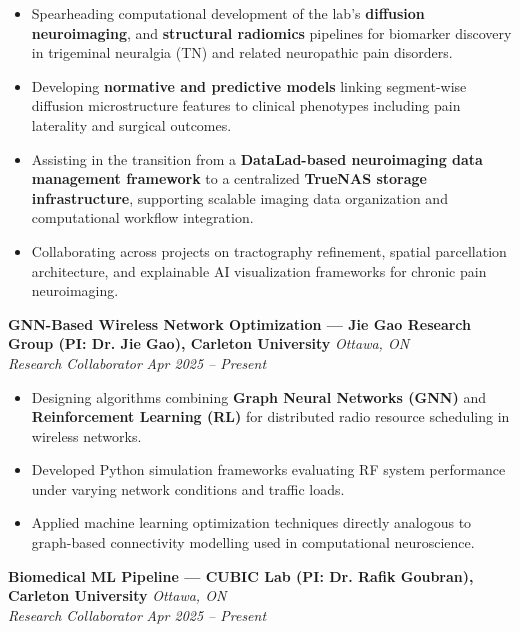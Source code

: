 \documentclass[11pt, letterpaper]{article}
\newcommand{\cventry}[4]{
    \noindent\textbf{#1} \hfill \textit{#2} \\
    \textit{#3} \hfill \textit{\small #4} \\
    \vspace{-4pt}
}
\begin{document}
\begin{itemize}[leftmargin=1.5em, topsep=2pt, itemsep=2pt]
    \item Spearheading computational development of the lab's \textbf{diffusion neuroimaging}, and \textbf{structural radiomics} pipelines for biomarker discovery in trigeminal neuralgia (TN) and related neuropathic pain disorders.

    \item Developing \textbf{normative and predictive models} linking segment-wise diffusion microstructure features to clinical phenotypes including pain laterality and surgical outcomes.

    \item Assisting in the transition from a \textbf{DataLad-based neuroimaging data management framework} to a centralized \textbf{TrueNAS storage infrastructure}, supporting scalable imaging data organization and computational workflow integration.

    \item Collaborating across projects on tractography refinement, spatial parcellation architecture, and explainable AI visualization frameworks for chronic pain neuroimaging.
\end{itemize}

\vspace{6pt}

\cventry{GNN-Based Wireless Network Optimization --- Jie Gao Research Group (PI: Dr. Jie Gao), Carleton University}{Ottawa, ON}{Research Collaborator}{Apr 2025 -- Present}

\begin{itemize}[leftmargin=1.5em, topsep=2pt, itemsep=2pt]
    \item Designing algorithms combining \textbf{Graph Neural Networks (GNN)} and \textbf{Reinforcement Learning (RL)} for distributed radio resource scheduling in wireless networks.

    \item Developed Python simulation frameworks evaluating RF system performance under varying network conditions and traffic loads.

    \item Applied machine learning optimization techniques directly analogous to graph-based connectivity modelling used in computational neuroscience.
\end{itemize}

\vspace{6pt}

\cventry{Biomedical ML Pipeline --- CUBIC Lab (PI: Dr. Rafik Goubran), Carleton University}{Ottawa, ON}{Research Collaborator}{Apr 2025 -- Present}
\end{document}
